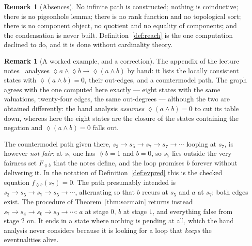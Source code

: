 \documentclass[11pt,a4paper]{article}
\theoremstyle{definition}
\newtheorem{remark}[theorem]{Remark}
\newcommand{\Event}{\mathop{\lozenge}}
\begin{document}
\begin{remark}[Absences]
No infinite path is constructed; nothing is coinductive; there is no pigeonhole
lemma; there is no rank function and no topological sort; there is no component
object, no quotient and no equality of components; and the condensation is
never built.  Definition~\ref{def:reach} is the one computation
\cite[\S4c]{m4} declined to do, and it is done without cardinality theory.
\end{remark}

\begin{remark}[A worked example, and a correction]\label{rem:lecture}
The appendix of the lecture notes~\cite{lec} analyses
$\Event a\wedge\Event b\to\Event(a\wedge b)$ by hand: it lists the locally
consistent states with $\Event(a\wedge b)=0$, their out-edges, and a
countermodel path.  The graph agrees with the one computed here exactly ---
eight states with the same valuations, twenty-four edges, the same out-degrees
--- although the two are obtained differently: the hand analysis \emph{assumes}
$\Event(a\wedge b)=0$ to cut its table down, whereas here the eight states are
the closure of the states containing the negation and $\Event(a\wedge b)=0$
falls out.

The countermodel path given there, $s_3\to s_5\to s_7\to s_7\to\cdots$ looping
at $s_7$, is however \emph{not fair}: at $s_7$ one has $\Event b=1$ and $b=0$,
so $s_7$ lies outside the very fairness set $F_{\Event b}$ that the notes
define, and the loop promises $b$ forever without delivering it.  In the
notation of Definition~\ref{def:evpred} this is the checked equation
$f_{\Event b}(s_7)=0$.  The path presumably intended is
$s_3\to s_5\to s_7\to s_5\to\cdots$, alternating so that $b$ recurs at $s_5$ and
$a$ at $s_7$; both edges exist.  The procedure of
Theorem~\ref{thm:sccmain} returns instead $s_7\to s_4\to s_0\to s_0\to\cdots$:
$a$ at stage $0$, $b$ at stage $1$, and everything false from stage $2$ on.  It
ends in a state where nothing is pending at all, which the hand analysis never
considers because it is looking for a loop that \emph{keeps} the eventualities
alive.
\end{remark}
\end{document}
